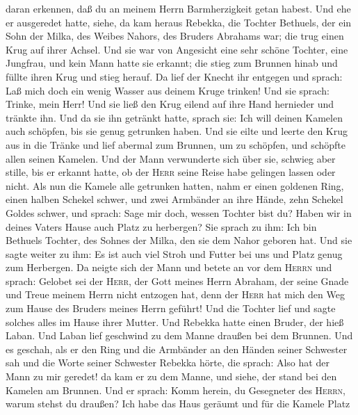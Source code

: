 daran erkennen, daß du an meinem Herrn Barmherzigkeit getan habest.
 Und ehe er ausgeredet hatte, siehe, da kam heraus
Rebekka, die Tochter Bethuels, der ein Sohn der Milka, des Weibes
Nahors, des Bruders Abrahams war; die trug einen Krug auf ihrer Achsel.
 Und sie war von Angesicht eine sehr schöne Tochter, eine
Jungfrau, und kein Mann hatte sie erkannt; die stieg zum Brunnen hinab
und füllte ihren Krug und stieg herauf.  Da lief der
Knecht ihr entgegen und sprach: Laß mich doch ein wenig Wasser aus
deinem Kruge trinken!  Und sie sprach: Trinke, mein Herr!
Und sie ließ den Krug eilend auf ihre Hand hernieder und tränkte ihn.
 Und da sie ihn getränkt hatte, sprach sie: Ich will
deinen Kamelen auch schöpfen, bis sie genug getrunken haben.
 Und sie eilte und leerte den Krug aus in die Tränke und
lief abermal zum Brunnen, um zu schöpfen, und schöpfte allen seinen
Kamelen.  Und der Mann verwunderte sich über sie, schwieg
aber stille, bis er erkannt hatte, ob der \textsc{Herr} seine Reise habe
gelingen lassen oder nicht.  Als nun die Kamele alle
getrunken hatten, nahm er einen goldenen Ring, einen halben Schekel
schwer, und zwei Armbänder an ihre Hände, zehn Schekel Goldes schwer,
 und sprach: Sage mir doch, wessen Tochter bist du? Haben
wir in deines Vaters Hause auch Platz zu herbergen?  Sie
sprach zu ihm: Ich bin Bethuels Tochter, des Sohnes der Milka, den sie
dem Nahor geboren hat.  Und sie sagte weiter zu ihm: Es
ist auch viel Stroh und Futter bei uns und Platz genug zum Herbergen.
 Da neigte sich der Mann und betete an vor dem
\textsc{Herrn}  und sprach: Gelobet sei der
\textsc{Herr}, der Gott meines Herrn Abraham, der seine Gnade und Treue
meinem Herrn nicht entzogen hat, denn der \textsc{Herr} hat mich den Weg
zum Hause des Bruders meines Herrn geführt!  Und die
Tochter lief und sagte solches alles im Hause ihrer Mutter.
 Und Rebekka hatte einen Bruder, der hieß Laban. Und
Laban lief geschwind zu dem Manne draußen bei dem Brunnen.
 Und es geschah, als er den Ring und die Armbänder an den
Händen seiner Schwester sah und die Worte seiner Schwester Rebekka
hörte, die sprach: Also hat der Mann zu mir geredet! da kam er zu dem
Manne, und siehe, der stand bei den Kamelen am Brunnen. 
Und er sprach: Komm herein, du Gesegneter des \textsc{Herrn}, warum
stehst du draußen? Ich habe das Haus geräumt und für die Kamele Platz
